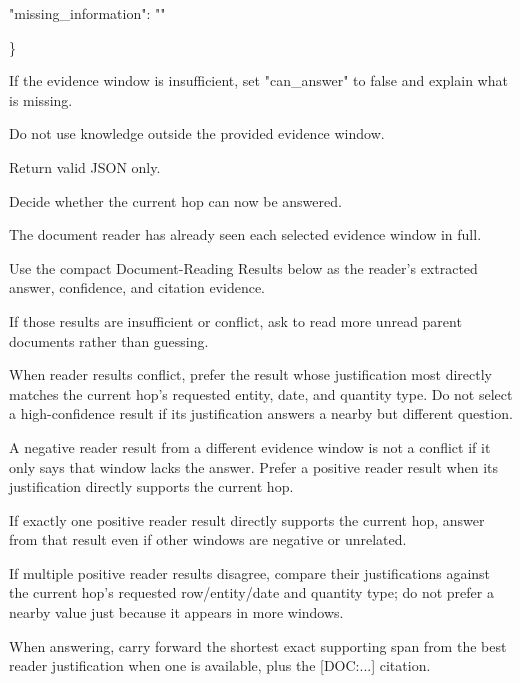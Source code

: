 \begin{tcolorbox}[colback=white, colframe=my-green, coltitle=black, parskip=5mm, title=\textbf{Document Read}, halign=flush left, enhanced, breakable, skin first=enhanced, skin middle=enhanced, skin last=enhanced]
\begin{scriptsize}
  "missing\_information": ""\par
\}\par
\mbox{}\par
If the evidence window is insufficient, set "can\_answer" to false and explain what is missing.\par
Do not use knowledge outside the provided evidence window.\par
Return valid JSON only.\par
\end{scriptsize}
\end{tcolorbox}

\begin{tcolorbox}[colback=white, colframe=my-green, coltitle=black, parskip=5mm, title=\textbf{Hop Resolve}, halign=flush left, enhanced, breakable, skin first=enhanced, skin middle=enhanced, skin last=enhanced]
\begin{scriptsize}
\ttfamily
\setlength{\parindent}{0pt}
Decide whether the current hop can now be answered.\par
\mbox{}\par
The document reader has already seen each selected evidence window in full.\par
Use the compact Document-Reading Results below as the reader's extracted answer, confidence, and citation evidence.\par
If those results are insufficient or conflict, ask to read more unread parent documents rather than guessing.\par
When reader results conflict, prefer the result whose justification most directly matches the current hop's requested entity, date, and quantity type. Do not select a high-confidence result if its justification answers a nearby but different question.\par
A negative reader result from a different evidence window is not a conflict if it only says that window lacks the answer. Prefer a positive reader result when its justification directly supports the current hop.\par
If exactly one positive reader result directly supports the current hop, answer from that result even if other windows are negative or unrelated.\par
If multiple positive reader results disagree, compare their justifications against the current hop's requested row/entity/date and quantity type; do not prefer a nearby value just because it appears in more windows.\par
When answering, carry forward the shortest exact supporting span from the best reader justification when one is available, plus the [DOC:...] citation.\par

\end{scriptsize}
\end{tcolorbox}
